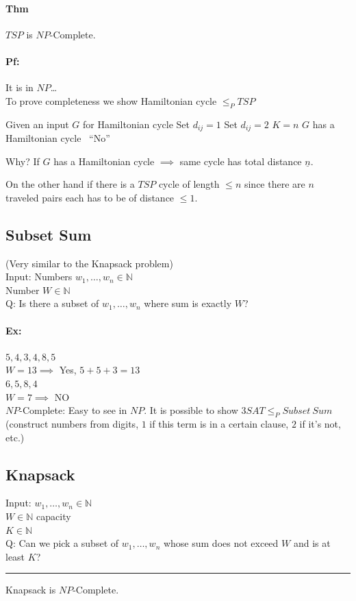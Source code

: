\documentclass[12 pt]{article}
\begin{document}
          \paragraph{Thm} $TSP$ is $NP$-Complete.
          \paragraph{Pf:} It is in $NP$\ldots
          \\ To prove completeness we show Hamiltonian cycle $\leq_P
          TSP$
          \begin{algorithmic}
            \State Given an input $G$ for Hamiltonian cycle
             Set $d_{ij}=1$
             Set $d_{ij}=2$
            \EndIf
            \State $K=n$
             $G$ has a
            Hamiltonian cycle
            \Else\ ``No''
            \EndIf
          \end{algorithmic}
          Why? If $G$ has a Hamiltonian cycle $\implies$ same cycle
          has total distance $\underline{n}$.

          On the other hand if there is a $TSP$ cycle of length $\leq
          n$ since there are $n$ traveled pairs each has to be of
          distance $\leq 1$.
          \subsection{Subset Sum} (Very similar to the Knapsack
          problem)
          \\ Input: Numbers $w_1, \ldots, w_n \in \mathbb{N}$
          \\ \phantom{Input:} Number $W \in \mathbb{N}$
          \\ Q: Is there a subset of $w_1, \ldots, w_n$ where sum is
          exactly $W$?
          \paragraph{Ex:} $5,4,3,4,8,5$
          \\ $W=13 \implies $ Yes, $5+5+3=13$
          \\ $6,5,8,4$
          \\ $W = 7 \implies$ NO
          \\ $NP$-Complete: Easy to see in $NP$. It is possible to
          show $3SAT \leq_P Subset \ Sum$ (construct numbers from
          digits, $1$ if this term is in a certain clause, $2$ if it's
          not, etc.)
          \subsection{Knapsack}
          Input: $w_1, \ldots, w_n \in \mathbb{N}$
          \\ \phantom{Input:} $W \in \mathbb{N}$ capacity
          \\ \phantom{Input:} $K \in \mathbb{N}$
          \\ Q: Can we pick a subset of $w_1, \ldots, w_n$ whose sum
          does not exceed $W$ and is at least $K$?
          \\ \noindent \rule{\textwidth}{0.5pt}
          Knapsack is $NP$-Complete.
\end{document}

